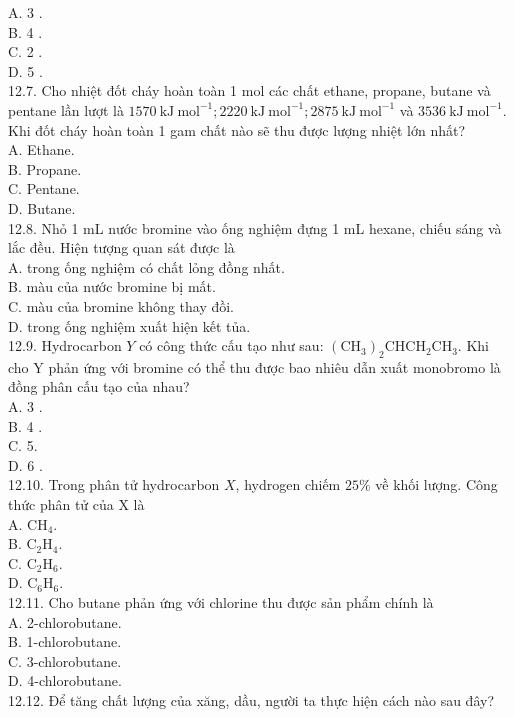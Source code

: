 \documentclass[10pt]{article}
\begin{document}
A. 3 .\\
B. 4 .\\
C. 2 .\\
D. 5 .\\
12.7. Cho nhiệt đốt cháy hoàn toàn 1 mol các chất ethane, propane, butane và pentane lần lượt là $1570 \mathrm{~kJ} \mathrm{~mol}^{-1} ; 2220 \mathrm{~kJ} \mathrm{~mol}^{-1} ; 2875 \mathrm{~kJ} \mathrm{~mol}^{-1}$ và $3536 \mathrm{~kJ} \mathrm{~mol}^{-1}$. Khi đốt cháy hoàn toàn 1 gam chất nào sẽ thu được lượng nhiệt lớn nhất?\\
A. Ethane.\\
B. Propane.\\
C. Pentane.\\
D. Butane.\\
12.8. Nhỏ 1 mL nước bromine vào ống nghiệm đựng 1 mL hexane, chiếu sáng và lắc đều. Hiện tượng quan sát được là\\
A. trong ống nghiệm có chất lỏng đồng nhất.\\
B. màu của nước bromine bị mất.\\
C. màu của bromine không thay đồi.\\
D. trong ống nghiệm xuất hiện kết tủa.\\
12.9. Hydrocarbon $Y$ có công thức cấu tạo như sau: $\left(\mathrm{CH}_{3}\right)_{2} \mathrm{CHCH}_{2} \mathrm{CH}_{3}$. Khi cho Y phản ứng với bromine có thể thu được bao nhiêu dẫn xuất monobromo là đồng phân cấu tạo của nhau?\\
A. 3 .\\
B. 4 .\\
C. 5.\\
D. 6 .\\
12.10. Trong phân tử hydrocarbon $X$, hydrogen chiếm $25 \%$ về khối lượng. Công thức phân tử của X là\\
A. $\mathrm{CH}_{4}$.\\
B. $\mathrm{C}_{2} \mathrm{H}_{4}$.\\
C. $\mathrm{C}_{2} \mathrm{H}_{6}$.\\
D. $\mathrm{C}_{6} \mathrm{H}_{6}$.\\
12.11. Cho butane phản ứng với chlorine thu được sản phẩm chính là\\
A. 2-chlorobutane.\\
B. 1-chlorobutane.\\
C. 3-chlorobutane.\\
D. 4-chlorobutane.\\
12.12. Để tăng chất lượng của xăng, dầu, người ta thực hiện cách nào sau đây?\\
\end{document}
